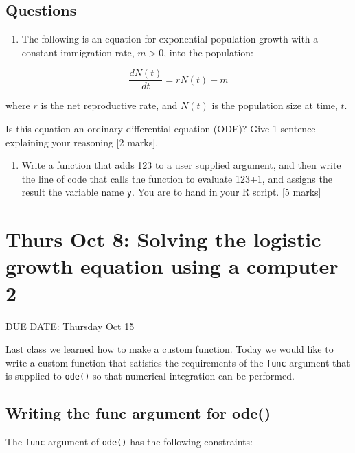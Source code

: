 \documentclass[]{book}
\providecommand{\tightlist}{%
  \setlength{\itemsep}{0pt}\setlength{\parskip}{0pt}}
\begin{document}
\section{Questions}\label{questions-9}

\begin{enumerate}
\def\labelenumi{\arabic{enumi}.}
\tightlist
\item
  The following is an equation for exponential population growth with a
  constant immigration rate, \(m>0\), into the population:
\end{enumerate}

\[
\frac{dN(t)}{dt}= rN(t) + m
\]

where \(r\) is the net reproductive rate, and \(N(t)\) is the population
size at time, \(t\).

Is this equation an ordinary differential equation (ODE)? Give 1
sentence explaining your reasoning {[}2 marks{]}.

\begin{enumerate}
\def\labelenumi{\arabic{enumi}.}
\setcounter{enumi}{1}
\tightlist
\item
  Write a function that adds 123 to a user supplied argument, and then
  write the line of code that calls the function to evaluate 123+1, and
  assigns the result the variable name \texttt{y}. You are to hand in
  your R script. {[}5 marks{]}
\end{enumerate}

\chapter{Thurs Oct 8: Solving the logistic growth equation using a
computer
2}\label{thurs-oct-8-solving-the-logistic-growth-equation-using-a-computer-2}

DUE DATE: Thursday Oct 15

Last class we learned how to make a custom function. Today we would like
to write a custom function that satisfies the requirements of the
\texttt{func} argument that is supplied to \texttt{ode()} so that
numerical integration can be performed.

\section{Writing the func argument for
ode()}\label{writing-the-func-argument-for-ode}

The \texttt{func} argument of \texttt{ode()} has the following
constraints:
\end{document}
